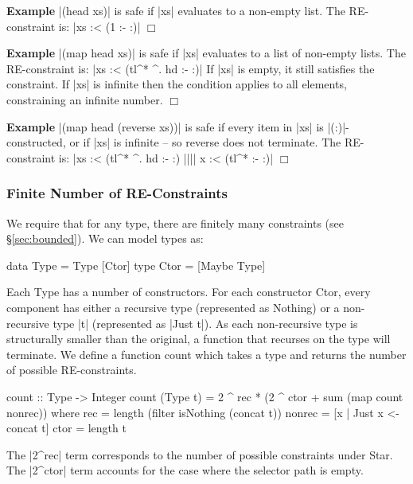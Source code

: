 \documentclass[preprint]{sigplanconf}
\newcommand{\C}[1]{\textsf{#1}}
\newcounter{exmp}
\newcommand{\yesexample}{\addtocounter{exmp}{1}\addvspace{2mm}\noindent\textbf{Example \arabic{exmp}}}
\newcommand{\noexample}{\hfill\ensuremath{\Box}\par\addvspace{2mm}}
\newenvironment{example}{\yesexample}{\noexample}
\newcommand{\ignore}{}
\begin{document}
\begin{example}
|(head xs)| is safe if |xs| evaluates to a non-empty list. The RE-constraint is: \ignore|xs :< (1 :- {:})|
\end{example}

\begin{example}
|(map head xs)| is safe if |xs| evaluates to a list of non-empty lists. The RE-constraint is: \ignore|xs :< (tl^* ^. hd :- {:})| If |xs| is empty, it still satisfies the constraint. If |xs| is infinite then the condition applies to all elements, constraining an infinite number.
\end{example}

\begin{example}
|(map head (reverse xs))| is safe if every item in |xs| is |(:)|-constructed, or if |xs| is infinite -- so \C{reverse} does not terminate. The RE-constraint is: \ignore|xs :< (tl^* ^. hd :- {:}) |||| x :< (tl^* :- {:})|
\end{example}

\subsubsection{Finite Number of RE-Constraints}
\label{sec:finite_re}

We require that for any type, there are finitely many constraints (see \S\ref{sec:bounded}). We can model types as:

\begin{code}
data Type  = Type [Ctor]
type Ctor  = [Maybe Type]
\end{code}

Each \C{Type} has a number of constructors. For each constructor \C{Ctor}, every component has either a recursive type (represented as \C{Nothing}) or a non-recursive type |t| (represented as |Just t|). As each non-recursive type is structurally smaller than the original, a function that recurses on the type will terminate. We define a function \C{count} which takes a type and returns the number of possible RE-constraints.

\begin{code}
count :: Type -> Integer
count (Type t) = 2 ^ rec * (2 ^ ctor + sum (map count nonrec))
    where
    rec = length (filter isNothing (concat t))
    nonrec = [x | Just x <- concat t]
    ctor = length t
\end{code}

The |2^rec| term corresponds to the number of possible constraints under \C{Star}. The |2^ctor| term accounts for the case where the selector path is empty.
\end{document}
